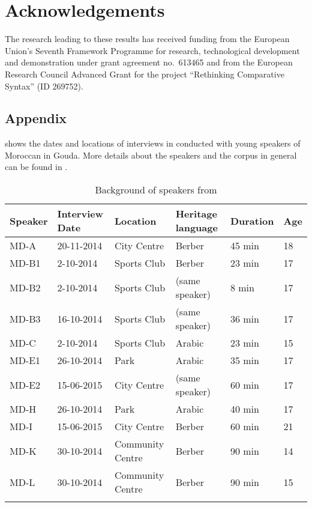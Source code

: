 \documentclass[output=paper]{langsci/langscibook}
\begin{document}
\section*{Acknowledgements}

The research leading to these results has received funding from the European
Union's Seventh Framework Programme for research, technological development and
demonstration under grant agreement no.\ 613465 and from the European Research
Council Advanced Grant for the project ``Rethinking Comparative Syntax'' (ID
269752).

\begin{subappendices}
\section{Appendix}
\label{sec:app}

\noindent {} shows the dates and locations of interviews in
conducted with young speakers of Moroccan  in Gouda. More details
about the speakers and the corpus in general can be found in
\citet{Mourigh:fc}.

\begin{table}[h!]
\caption{Background of speakers from \citet{Mourigh:fc}}
{\smaller
\begin{center}
\begin{tabular}{llllll}
\lsptoprule
\textbf{Speaker}	&	\textbf{Interview Date}	&	\textbf{Location}	&	\textbf{Heritage language}	&	\textbf{Duration}	&	\textbf{Age}	\\
\midrule
MD-A	&	20-11-2014	&	City Centre	&	Berber	&	45 min	&	18	\\
MD-B1	&	2-10-2014	&	Sports Club	&	Berber	&	23 min	&	17	\\
MD-B2	&	2-10-2014	&	Sports Club	&	(same speaker)	&	8 min	&	17	\\
MD-B3	&	16-10-2014	&	Sports Club	&	(same speaker)	&	36 min	&	17	\\
MD-C	&	2-10-2014	&	Sports Club	&	Arabic	&	23 min	&	15	\\
MD-E1	&	26-10-2014	&	Park	&	Arabic	&	35 min	&	17	\\
MD-E2	&	15-06-2015	&	City Centre	&	(same speaker)	&	60 min	&	17	\\
MD-H	&	26-10-2014	&	Park	&	Arabic	&	40 min	&	17	\\
MD-I	&	15-06-2015	&	City Centre	&	Berber	&	60 min	&	21	\\
MD-K	&	30-10-2014	&	Community Centre	&	Berber	&	90 min	&	14	\\
MD-L	&	30-10-2014	&	Community Centre	&	Berber	&	90 min	&	15	\\
\lspbottomrule
\end{tabular}
\end{center}
\label{default}
}
\end{table}%
\end{subappendices}

{\sloppy
\printbibliography[heading=subbibliography,notkeyword=this]
}

\end{document}
